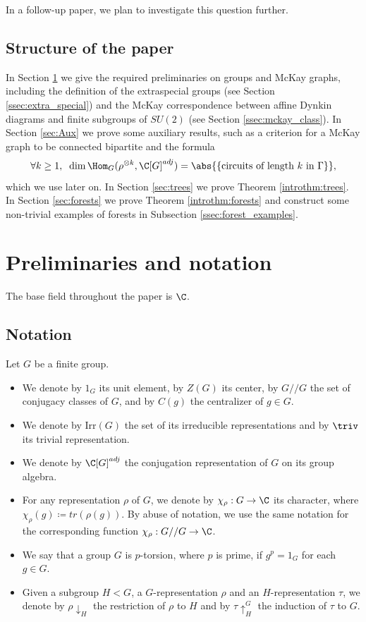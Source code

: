 In a follow-up paper, we plan to investigate this question further.
\subsection{Structure of the paper}
In Section \ref{sec:prelim} we give the required preliminaries on groups and McKay graphs, including the definition of the extraspecial groups (see Section \ref{ssec:extra_special}) and the McKay correspondence between affine Dynkin diagrams and finite subgroups of $SU(2)$ (see Section \ref{ssec:mckay_class}). In Section \ref{sec:Aux} we prove some auxiliary results, such as a criterion for a McKay graph {to be  connected bipartite} and the formula $$\forall k\geq 1, \;\;
\dim \Hom_G(\rho^{\otimes k}, \C[G]^{adj}) = \abs{\{\text{circuits of length } k \text{ in } \Gamma \}},  $$
which we use later on.
In Section \ref{sec:trees} we prove Theorem \ref{introthm:trees}. In Section \ref{sec:forests} we prove Theorem \ref{introthm:forests} and construct some non-trivial examples of forests in Subsection \ref{ssec:forest_examples}. 




\section{Preliminaries and notation}\label{sec:prelim}
The base field throughout the paper is $\C$.
\subsection{Notation}
\begin{nota}
 Let $G$ be a finite group.
 \begin{itemize}
 \item We denote by $1_G$ its unit element, by $Z(G)$ its center, by $G//G$ the set of conjugacy classes of $G$, and by $C(g)$ the centralizer of $g\in G$.
  \item We denote by $\mathrm{Irr}(G)$ the set of its irreducible representations and by $\triv$ its trivial representation. 
  \item We denote by $\C[G]^{adj}$ the conjugation representation of $G$ on its group algebra.
  \item For any representation $\rho$ of $G$, we denote by $\chi_\rho: G\to \C$ its character, where $\chi_\rho(g)\coloneqq tr (\rho(g))$. By abuse of notation, we use the same notation for the corresponding function $\chi_\rho: G//G \to \C$.
 \item We say that a group $G$ is $p$-torsion, where $p$ is prime, if $g^p = 1_G$ for each $g \in G$.
 \item Given a subgroup $H < G$, a $G$-representation $\rho$ and an $H$-representation $\tau$, we denote by $\rho \downarrow_H$ the restriction of $\rho$ to $H$ and by $\tau \uparrow^G_H$ the induction of $\tau$ to $G$.
 \end{itemize}

\end{nota}

